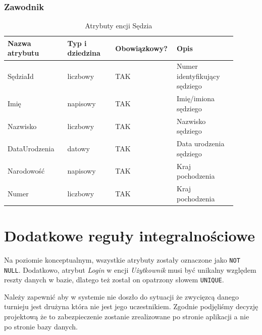 \documentclass{mwrep}[15pt]
\begin{document}
\subsubsection{Zawodnik}
\begin{table}[H]
	\begin{tabular}{|p{0.25\linewidth}|p{0.2\linewidth}|p{0.2\linewidth}|p{0.25\linewidth}|}
	\hline
	Nazwa atrybutu & Typ i dziedzina & Obowiązkowy? & Opis                                                           \\ \hline
	SędziaId   & liczbowy                            & TAK                              & Numer identyfikujący sędziego                                                   \\ \hline
	Imię         & napisowy                           & TAK                              & Imię/imiona sędziego        \\ \hline
	Nazwisko	   & liczbowy							& TAK								& Nazwisko sędziego \\  \hline
	DataUrodzenia          & datowy                           & TAK                              & Data urodzenia sędziego              \\ \hline
	Narodowość           & napisowy                            & TAK                              & Kraj pochodzenia   \\ \hline
	Numer           & liczbowy                            & TAK                              & Kraj pochodzenia   \\ \hline
	\end{tabular}
	\caption{Atrybuty encji Sędzia}
\end{table}

\section{Dodatkowe reguły integralnościowe}

Na poziomie konceptualnym, wszystkie atrybuty zostały oznaczone jako \texttt{NOT NULL}. Dodatkowo, atrybut \emph{Login} w encji
\emph{Użytkownik} musi być unikalny względem reszty danych w bazie, dlatego też został on opatrzony słowem \texttt{UNIQUE}.

Należy zapewnić aby w systemie nie doszło do sytuacji że zwycięzcą danego turnieju jest drużyna która nie jest jego uczestnikiem.
Zgodnie podjęliśmy decyzję projektową że to zabezpieczenie zostanie zrealizowane po stronie aplikacji a nie po stronie bazy danych.

\vspace{1cm}
\end{document}
